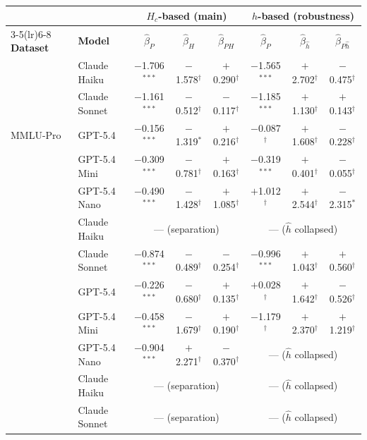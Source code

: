 \begin{tabular}{ll ccc ccc}
\toprule
 & & \multicolumn{3}{c}{\textbf{$H_c$-based (main)}} & \multicolumn{3}{c}{\textbf{$\hat h$-based (robustness)}} \\
\cmidrule(lr){3-5}\cmidrule(lr){6-8}
\textbf{Dataset} & \textbf{Model} & $\hat\beta_P$ & $\hat\beta_H$ & $\hat\beta_{PH}$ & $\hat\beta_P$ & $\hat\beta_{\hat h}$ & $\hat\beta_{P\hat h}$ \\
\midrule
\multirow{5}{*}{MMLU-Pro}
 & Claude Haiku & $-$1.706$^{***}$ & $-$1.578$^\dagger$ & $+$0.290$^\dagger$ & $-$1.565$^{***}$ & $+$2.702$^\dagger$ & $-$0.475$^\dagger$ \\
  & Claude Sonnet & $-$1.161$^{***}$ & $-$0.512$^\dagger$ & $-$0.117$^\dagger$ & $-$1.185$^{***}$ & $+$1.130$^\dagger$ & $+$0.143$^\dagger$ \\
  & GPT-5.4 & $-$0.156$^{***}$ & $-$1.319$^{*}$ & $+$0.216$^\dagger$ & $-$0.087$^\dagger$ & $+$1.608$^\dagger$ & $-$0.228$^\dagger$ \\
  & GPT-5.4 Mini & $-$0.309$^{***}$ & $-$0.781$^\dagger$ & $+$0.163$^\dagger$ & $-$0.319$^{***}$ & $+$0.401$^\dagger$ & $-$0.055$^\dagger$ \\
  & GPT-5.4 Nano & $-$0.490$^{***}$ & $-$1.428$^\dagger$ & $+$1.085$^\dagger$ & $+$1.012$^\dagger$ & $+$2.544$^\dagger$ & $-$2.315$^{*}$ \\
\addlinespace
\midrule
\multirow{5}{*}{GPQA-Diamond}
 & Claude Haiku & \multicolumn{3}{c}{--- \tiny{(separation)}} & \multicolumn{3}{c}{--- \tiny{($\hat h$ collapsed)}} \\
  & Claude Sonnet & $-$0.874$^{***}$ & $-$0.489$^\dagger$ & $-$0.254$^\dagger$ & $-$0.996$^{***}$ & $+$1.043$^\dagger$ & $+$0.560$^\dagger$ \\
  & GPT-5.4 & $-$0.226$^{***}$ & $-$0.680$^\dagger$ & $+$0.135$^\dagger$ & $+$0.028$^\dagger$ & $+$1.642$^\dagger$ & $-$0.526$^\dagger$ \\
  & GPT-5.4 Mini & $-$0.458$^{***}$ & $-$1.679$^\dagger$ & $+$0.190$^\dagger$ & $-$1.179$^\dagger$ & $+$2.370$^\dagger$ & $+$1.219$^\dagger$ \\
  & GPT-5.4 Nano & $-$0.904$^{***}$ & $+$2.271$^\dagger$ & $-$0.370$^\dagger$ & \multicolumn{3}{c}{--- \tiny{($\hat h$ collapsed)}} \\
\addlinespace
\midrule
\multirow{6}{*}{HLE}
 & Claude Haiku & \multicolumn{3}{c}{--- \tiny{(separation)}} & \multicolumn{3}{c}{--- \tiny{($\hat h$ collapsed)}} \\
  & Claude Sonnet & \multicolumn{3}{c}{--- \tiny{(separation)}} & \multicolumn{3}{c}{--- \tiny{($\hat h$ collapsed)}} \\

\end{tabular}

